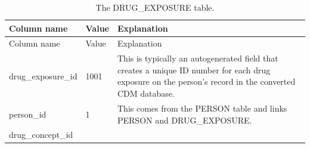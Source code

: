 \documentclass[11pt]{book}
\theoremstyle{definition}
\theoremstyle{definition}
\theoremstyle{definition}
\theoremstyle{remark}
\begin{document}
\begin{longtable}[]{@{}lll@{}}
\caption{\label{tab:drugExposure} The DRUG\_EXPOSURE table.}\tabularnewline
\toprule
\begin{minipage}[b]{0.28\columnwidth}\raggedright
Column name\strut
\end{minipage} & \begin{minipage}[b]{0.15\columnwidth}\raggedright
Value\strut
\end{minipage} & \begin{minipage}[b]{0.49\columnwidth}\raggedright
Explanation\strut
\end{minipage}\tabularnewline
\midrule
\endfirsthead
\toprule
\begin{minipage}[b]{0.28\columnwidth}\raggedright
Column name\strut
\end{minipage} & \begin{minipage}[b]{0.15\columnwidth}\raggedright
Value\strut
\end{minipage} & \begin{minipage}[b]{0.49\columnwidth}\raggedright
Explanation\strut
\end{minipage}\tabularnewline
\midrule
\endhead
\begin{minipage}[t]{0.28\columnwidth}\raggedright
drug\_exposure\_id\strut
\end{minipage} & \begin{minipage}[t]{0.15\columnwidth}\raggedright
1001\strut
\end{minipage} & \begin{minipage}[t]{0.49\columnwidth}\raggedright
This is typically an autogenerated field that creates a unique ID number for each drug exposure on the person's record in the converted CDM database.\strut
\end{minipage}\tabularnewline
\begin{minipage}[t]{0.28\columnwidth}\raggedright
person\_id\strut
\end{minipage} & \begin{minipage}[t]{0.15\columnwidth}\raggedright
1\strut
\end{minipage} & \begin{minipage}[t]{0.49\columnwidth}\raggedright
This comes from the PERSON table and links PERSON and DRUG\_EXPOSURE.\strut
\end{minipage}\tabularnewline
\begin{minipage}[t]{0.28\columnwidth}\raggedright
drug\_concept\_id\strut
\end{minipage} & \begin{minipage}[t]{0.15\columnwidth}\raggedright

\end{minipage}
\end{longtable}
\end{document}
